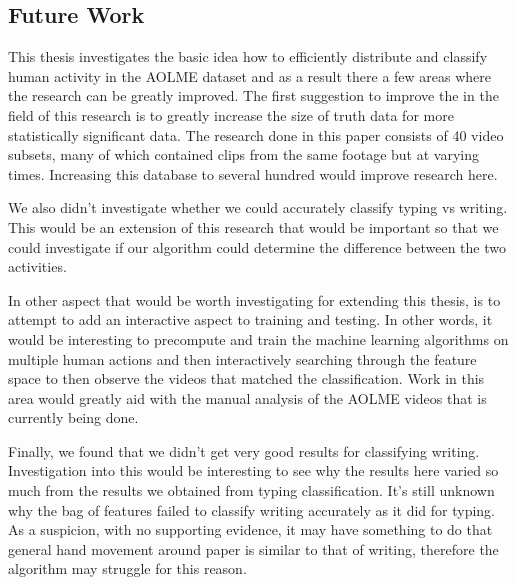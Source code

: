 \subsection{Future Work}
This thesis investigates the basic idea how to efficiently distribute and classify
human activity in the AOLME dataset and as a result there a few areas where the
research can be greatly improved. The first suggestion to improve the in the field
of this research is to greatly increase the size of truth data for more
statistically significant data. The research done in this paper consists of 40 video
subsets, many of which contained clips from the same footage but at varying times.
Increasing this database to several hundred would improve research here.

We also didn't investigate whether we could accurately classify typing vs writing.
This would be an extension of this research that would be important so that we
could investigate if our algorithm could determine the difference between the two
activities.

In other aspect that would be worth investigating for extending this thesis,
is to attempt to add an interactive aspect to training and testing. In other words,
it would be interesting to precompute and train the machine learning algorithms
on multiple human actions and then interactively searching through the feature
space to then observe the videos that matched the classification. Work in this
area would greatly aid with the manual analysis of the AOLME videos that is
currently being done.

Finally, we found that we didn't get very good results for classifying writing.
Investigation into this would be interesting to see why the results here varied
so much from the results we obtained from typing classification. It's still unknown
why the bag of features failed to classify writing accurately as it did for typing.
As a suspicion, with no supporting evidence, it may have something to do that
general hand movement around paper is similar to that of writing, therefore the
algorithm may struggle for this reason.



